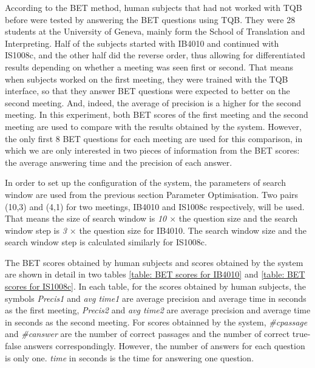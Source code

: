 According to the BET method, human subjects that had not worked with TQB before were tested by answering the BET questions using TQB. They were 28 students at the University of Geneva, mainly form the School of Translation and Interpreting. Half of the subjects started with IB4010 and continued with IS1008c, and the other half did the reverse order, thus allowing for differentiated results depending on whether a meeting was seen first or second. That means when subjects worked on the first meeting, they were trained with the TQB interface, so that they answer BET questions were expected to better on the second meeting. And, indeed, the average of precision is a higher for the second meeting. In this experiment, both BET scores of the first meeting and the second meeting are used to compare with the results obtained by the system. However, the only first 8 BET questions for each meeting are used for this comparison, in which  we are only interested in two pieces of information from the BET scores: the average answering time and the precision of each answer. 

In order to set up the configuration of the system, the parameters of search window are used from the previous section Parameter Optimisation. Two pairs (10,3) and (4,1) for two meetings, IB4010 and IS1008c respectively, will be used. That means the size of search window is \textit{10 \ensuremath{\times}} the question size and the search window step is \textit{3 \ensuremath{\times}} the question size for IB4010. The search window size and the search window step is calculated similarly for IS1008c.

The BET scores obtained by human subjects and scores obtained by the system are shown in detail in two tables \ref{table: BET scores for IB4010} and \ref{table: BET scores for IS1008c}. In each table, for the scores obtained by human subjects, the symbols \textit{Precis1} and \textit{avg time1} are average precision and average time in seconds as the first meeting, \textit{Precis2} and \textit{avg time2} are average precision and average time in seconds as the second meeting. For scores obtainned by the system, \textit{\#cpassage} and \textit{\#canswer} are the number of correct passages and the number of correct true-false answers correspondingly. However, the number of answers for each question is only one. \textit{time} in seconds is the time for answering one question.




